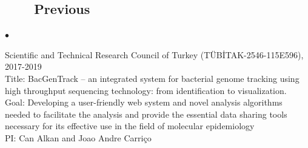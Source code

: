 \documentclass[margin,line]{res}
\newenvironment{list2}{
  \begin{list}{$\bullet$}{%
      \setlength{\itemsep}{0.1cm}
      \setlength{\parsep}{0in} \setlength{\parskip}{0in}
      \setlength{\topsep}{0in} \setlength{\partopsep}{0in} 
      \setlength{\leftmargin}{0.2in}}}{\end{list}}
\begin{document}
\begin{resume}
\vspace{-0.5cm}
                                       \subsection{\small \sc ~~~~Previous}
                                       \begin{list2}
                                       \item
                                         Scientific and Technical Research Council of Turkey (T\"{U}B\.{I}TAK-2546-115E596), 2017-2019\\
                                         Title: BacGenTrack – an integrated system for bacterial genome tracking using high throughput sequencing technology: from identification to visualization.\\
                                         Goal: Developing a user-friendly web system and novel analysis algorithms needed to facilitate the analysis and provide
                                         the essential data sharing tools necessary for its effective use in the field of molecular epidemiology\\
                                         PI: Can Alkan and Joao Andre Carriço


\end{list2}
\end{resume}
\end{document}
